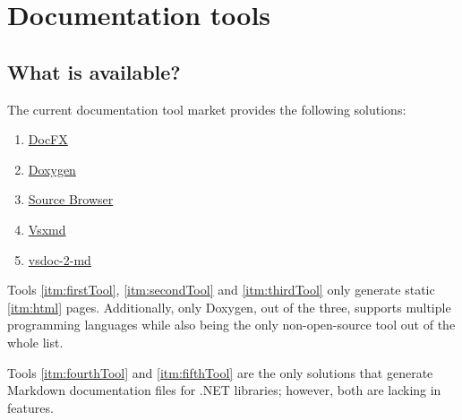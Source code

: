 \chapter{Documentation tools}
\section{What is available?}
The current documentation tool market provides the following solutions:

\begin{enumerate}
    \item \label{itm:firstTool} \href{https://github.com/dotnet/docfx}{DocFX}
    \item \label{itm:secondTool} \href{https://www.doxygen.nl/}{Doxygen}
    \item \label{itm:thirdTool} \href{https://github.com/KirillOsenkov/SourceBrowser}{Source Browser}
    \item \label{itm:fourthTool} \href{https://github.com/lijunle/Vsxmd}{Vsxmd}
    \item \label{itm:fifthTool} \href{https://github.com/discosultan/vsdoc-2-md}{vsdoc-2-md}
\end{enumerate}

Tools \ref{itm:firstTool}, \ref{itm:secondTool} and \ref{itm:thirdTool} only generate static \ref{itm:html} pages. Additionally, only Doxygen, out of the three, supports multiple programming languages while also being the only non-open-source tool out of the whole list.

Tools \ref{itm:fourthTool} and \ref{itm:fifthTool} are the only solutions that generate Markdown documentation files for .NET libraries; however, both are lacking in features.
